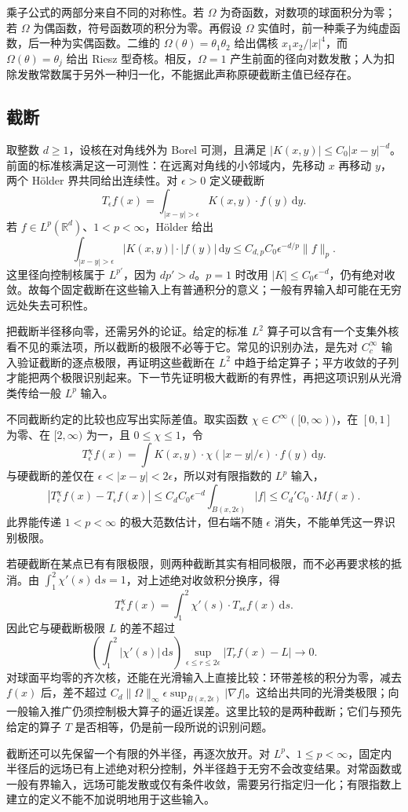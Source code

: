 乘子公式的两部分来自不同的对称性。若 \(\Omega\) 为奇函数，对数项的球面积分为零；若 \(\Omega\) 为偶函数，符号函数项的积分为零。再假设 \(\Omega\) 实值时，前一种乘子为纯虚函数，后一种为实偶函数。二维的 \(\Omega(\theta)=\theta_1\theta_2\) 给出偶核 \(x_1x_2/|x|^4\)，而 \(\Omega(\theta)=\theta_j\) 给出 Riesz 型奇核。相反，\(\Omega=1\) 产生前面的径向对数发散；人为扣除发散常数属于另外一种归一化，不能据此声称原硬截断主值已经存在。

\subsection{截断}
\label{b2:subsec:180304}

取整数 \(d\geq1\)，设核在对角线外为 Borel 可测，且满足 \(|K(x,y)|\leq C_0|x-y|^{-d}\)。前面的标准核满足这一可测性：在远离对角线的小邻域内，先移动 \(x\) 再移动 \(y\)，两个 Hölder 界共同给出连续性。对 \(\epsilon>0\) 定义硬截断
\[
 T_\epsilon f(x)=\int_{|x-y|>\epsilon}K(x,y)\cdot f(y)\,\mathrm dy.
\]
若 \(f\in L^p(\mathbb R^d)\)、\(1<p<\infty\)，Hölder 给出
\[
 \int_{|x-y|>\epsilon}|K(x,y)|\cdot|f(y)|\,\mathrm dy
 \leq C_{d,p}C_0\epsilon^{-d/p}\|f\|_p.
\]
这里径向控制核属于 \(L^{p'}\)，因为 \(dp'>d\)。\(p=1\) 时改用 \(|K|\leq C_0\epsilon^{-d}\)，仍有绝对收敛。故每个固定截断在这些输入上有普通积分的意义；一般有界输入却可能在无穷远处失去可积性。

\ProseParagraphBreak

把截断半径移向零，还需另外的论证。给定的标准 \(L^2\) 算子可以含有一个支集外核看不见的乘法项，所以截断的极限不必等于它。常见的识别办法，是先对 \(C_c^\infty\) 输入验证截断的逐点极限，再证明这些截断在 \(L^2\) 中趋于给定算子；平方收敛的子列才能把两个极限识别起来。下一节先证明极大截断的有界性，再把这项识别从光滑类传给一般 \(L^p\) 输入。

\ProseParagraphBreak

不同截断约定的比较也应写出实际差值。取实函数 \(\chi\in C^\infty([0,\infty))\)，在 \([0,1]\) 为零、在 \([2,\infty)\) 为一，且 \(0\leq\chi\leq1\)，令
\[
 T^\chi_\epsilon f(x)=\int K(x,y)\cdot
                 \chi(|x-y|/\epsilon)\cdot f(y)\,\mathrm dy.
\]
与硬截断的差仅在 \(\epsilon<|x-y|<2\epsilon\)，所以对有限指数的 \(L^p\) 输入，
\[
 |T^\chi_\epsilon f(x)-T_\epsilon f(x)|
 \leq C_dC_0\epsilon^{-d}\int_{B(x,2\epsilon)}|f|
 \leq C_d'C_0\cdot Mf(x).
\]
此界能传递 \(1<p<\infty\) 的极大范数估计，但右端不随 \(\epsilon\) 消失，不能单凭这一界识别极限。

\ProseParagraphBreak

若硬截断在某点已有有限极限，则两种截断其实有相同极限，而不必再要求核的抵消。由 \(\int_1^2\chi'(s)\,\mathrm ds=1\)，对上述绝对收敛积分换序，得
\[
 T^\chi_\epsilon f(x)=\int_1^2\chi'(s)\cdot T_{s\epsilon}f(x)\,\mathrm ds.
\]
因此它与硬截断极限 \(L\) 的差不超过
\[
 \left(\int_1^2|\chi'(s)|\,\mathrm ds\right)
 \sup_{\epsilon\leq r\leq2\epsilon}|T_rf(x)-L|\longrightarrow0.
\]
对球面平均零的齐次核，还能在光滑输入上直接比较：环带差核的积分为零，减去 \(f(x)\) 后，差不超过
\(C_d\|\Omega\|_\infty\epsilon\sup_{B(x,2\epsilon)}|\nabla f|\)。这给出共同的光滑类极限；向一般输入推广仍须控制极大算子的逼近误差。这里比较的是两种截断；它们与预先给定的算子 \(T\) 是否相等，仍是前一段所说的识别问题。

\ProseParagraphBreak

截断还可以先保留一个有限的外半径，再逐次放开。对 \(L^p\)、\(1\leq p<\infty\)，固定内半径后的远场已有上述绝对积分控制，外半径趋于无穷不会改变结果。对常函数或一般有界输入，远场可能发散或仅有条件收敛，需要另行指定归一化；有限指数上建立的定义不能不加说明地用于这些输入。
